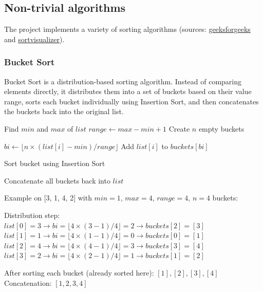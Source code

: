 \documentclass{article}
\begin{document}
\subsection{Non-trivial algorithms}

The project implements a variety of sorting algorithms (sources: 
 \href{https://www.geeksforgeeks.org}{geeksforgeeks} 
and
\href{https://www.sortvisualizer.com/}{sortvisualizer}).

\subsubsection{Bucket Sort}

Bucket Sort is a distribution-based sorting algorithm. Instead of comparing elements directly, it distributes them into a set of buckets based on their value range, sorts each bucket individually using Insertion Sort, and then concatenates the buckets back into the original list.

\begin{algorithm}[H]
\caption{Pseudocode for Bucket Sort}
\begin{algorithmic}[1]
    \State Find $min$ and $max$ of $list$
    \State $range \gets max - min + 1$
    \State Create $n$ empty buckets

        \State $bi \gets \lfloor n \times (list[i] - min) / range \rfloor$
        \State Add $list[i]$ to $buckets[bi]$
    \EndFor

        \State Sort bucket using Insertion Sort
    \EndFor

    \State Concatenate all buckets back into $list$
\end{algorithmic}
\end{algorithm}

Example on [3, 1, 4, 2] with $min=1$, $max=4$, $range=4$, $n=4$ buckets:

Distribution step: \\
$list[0]=3 \rightarrow bi = \lfloor 4 \times (3-1)/4 \rfloor = 2 \rightarrow buckets[2] = [3]$ \\
$list[1]=1 \rightarrow bi = \lfloor 4 \times (1-1)/4 \rfloor = 0 \rightarrow buckets[0] = [1]$ \\
$list[2]=4 \rightarrow bi = \lfloor 4 \times (4-1)/4 \rfloor = 3 \rightarrow buckets[3] = [4]$ \\
$list[3]=2 \rightarrow bi = \lfloor 4 \times (2-1)/4 \rfloor = 1 \rightarrow buckets[1] = [2]$

After sorting each bucket (already sorted here): $[1], [2], [3], [4]$ \\
Concatenation: $[1, 2, 3, 4]$
\end{document}
